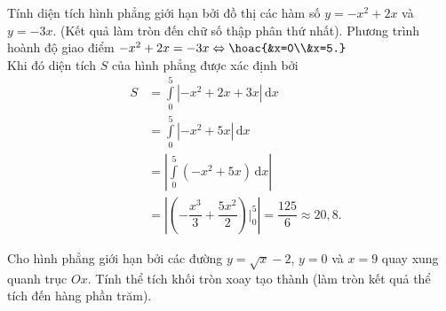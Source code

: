 \begin{ex}%
	Tính diện tích hình phẳng giới hạn bởi đồ thị các hàm số $y=-x^2+2x$ và $y=-3x$. (Kết quả làm tròn đến chữ số thập phân thứ nhất).
	\loigiai
	{Phương trình hoành độ giao điểm $-x^2+2x=-3x\Leftrightarrow\hoac{&x=0\\&x=5.}$\\
		Khi đó diện tích $S$ của hình phẳng được xác định bởi
		\begin{eqnarray*}
			&S&=\displaystyle\int \limits_0^5|-x^2+2x+3x|\mathrm{\, d}x\\
			&&=\displaystyle\int\limits_0^5|-x^2+5x|\mathrm{\, d}x\\
			&&=\left| \displaystyle\int\limits_0^5(-x^2+5x)\mathrm{\, d}x\right|\\
			&&=\left| \left(-\dfrac{x^3}{3}+\dfrac{5x^2}{2}\right)\Bigg|_0^5\right| =\dfrac{125}{6}\approx 20{,}8.
		\end{eqnarray*}
	}
\end{ex}

\begin{ex}%
	Cho hình phẳng giới hạn bởi các đường $y=\sqrt{x}-2$, $y=0$ và $x=9$ quay xung quanh trục $Ox$. Tính thể tích khối tròn xoay tạo thành (làm tròn kết quả thể tích đến hàng phần trăm).
\end{ex}


